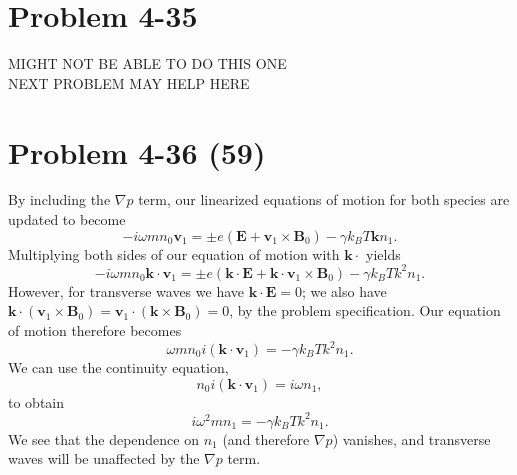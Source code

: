 \section*{Problem 4-35}
\label{sec:4-35}
MIGHT NOT BE ABLE TO DO THIS ONE\\
NEXT PROBLEM MAY HELP HERE

\section*{Problem 4-36 (59)}
\label{sec:4-36}
By including the \(\nabla p \) term, our linearized equations of motion for both species are updated to become
\begin{equation*}
	-i\omega m n_0 \bm{v}_1 = \pm e \left(\bm{E} + \bm{v}_1 \times \bm{B}_0 \right) - \gamma k_BT\bm{k}n_1.
\end{equation*}
Multiplying both sides of our equation of motion with \(\bm{k} \cdot  \) yields
\begin{equation*}
-i\omega m n_0 \bm{k} \cdot\bm{v}_1 = \pm e \left(\bm{k} \cdot\bm{E} + \bm{k} \cdot\bm{v}_1 \times \bm{B}_0 \right) - \gamma k_BTk^2n_1.
\end{equation*}
However, for transverse waves we have \(\bm{k} \cdot \bm{E} = 0 \); we also have \(\bm{k} \cdot \left(\bm{v}_1 \times \bm{B}_0\right) = \bm{v}_1 \cdot \left(\bm{k} \times \bm{B}_0\right) = 0 \), by the problem specification. Our equation of motion therefore becomes 
\begin{equation*}
	\omega m n_0 i \left(\bm{k} \cdot \bm{v}_1 \right) = -\gamma k_BTk^2n_1.
\end{equation*}
We can use the continuity equation,
\begin{equation*}
	n_0 i \left(\bm{k} \cdot \bm{v}_1 \right) = i\omega n_1,
\end{equation*}
to obtain
\begin{equation*}
	i\omega^2m n_1 = -\gamma k_BTk^2n_1.
\end{equation*}
We see that the dependence on \(n_1\) (and therefore \(\nabla p \)) vanishes, and transverse waves will be unaffected by the \(\nabla p \) term.

